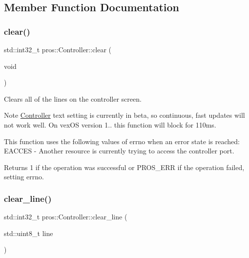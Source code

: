 \subsection{Member Function Documentation}
\mbox{\label{classpros_1_1Controller_a49a332fe032c3aaf94e24bb3a51945e1}} 
\subsubsection{\texorpdfstring{clear()}{clear()}}
{\footnotesize\ttfamily std\+::int32\+\_\+t pros\+::\+Controller\+::clear (\begin{DoxyParamCaption}\item[{void}]{ }\end{DoxyParamCaption})}



Clears all of the lines on the controller screen. 

\begin{DoxyNote}{Note}
\hyperlink{classpros_1_1Controller}{Controller} text setting is currently in beta, so continuous, fast updates will not work well. On vex\+OS version 1.. this function will block for 110ms.
\end{DoxyNote}
This function uses the following values of errno when an error state is reached\+: E\+A\+C\+C\+ES -\/ Another resource is currently trying to access the controller port.

\begin{DoxyReturn}{Returns}
1 if the operation was successful or P\+R\+O\+S\+\_\+\+E\+RR if the operation failed, setting errno. 
\end{DoxyReturn}
\mbox{\label{classpros_1_1Controller_a9f65f6c26d55619a658aa103d3532583}} 
\subsubsection{\texorpdfstring{clear\+\_\+line()}{clear\_line()}}
{\footnotesize\ttfamily std\+::int32\+\_\+t pros\+::\+Controller\+::clear\+\_\+line (\begin{DoxyParamCaption}\item[{std\+::uint8\+\_\+t}]{line }\end{DoxyParamCaption})}



